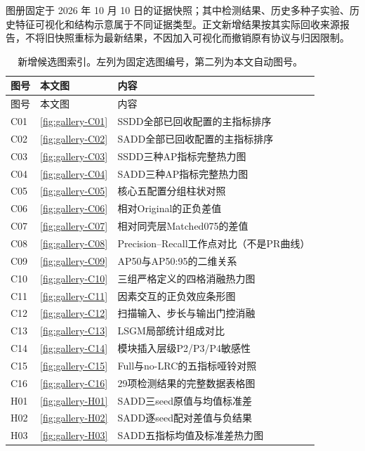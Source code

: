 \documentclass[journal]{IEEEtran}
\begin{document}
图册固定于 2026 年 10 月 10 日的证据快照；其中检测结果、历史多种子实验、历史特征可视化和结构示意属于不同证据类型。正文新增结果按其实际回收来源报告，不将旧快照重标为最新结果，不因加入可视化而撤销原有协议与归因限制。

\small
\begin{longtable}{@{}p{}p{}p{}@{}}
\caption{新增候选图索引。左列为固定选图编号，第二列为本文自动图号。}\label{tab:gallery_index}\\
\toprule
图号 & 本文图 & 内容 \\
\midrule
\endfirsthead
\toprule
图号 & 本文图 & 内容 \\
\midrule
\endhead
\bottomrule
\endfoot
C01 & \ref{fig:gallery-C01} & SSDD全部已回收配置的主指标排序 \\
C02 & \ref{fig:gallery-C02} & SADD全部已回收配置的主指标排序 \\
C03 & \ref{fig:gallery-C03} & SSDD三种AP指标完整热力图 \\
C04 & \ref{fig:gallery-C04} & SADD三种AP指标完整热力图 \\
C05 & \ref{fig:gallery-C05} & 核心五配置分组柱状对照 \\
C06 & \ref{fig:gallery-C06} & 相对Original的正负差值 \\
C07 & \ref{fig:gallery-C07} & 相对同壳层Matched075的差值 \\
C08 & \ref{fig:gallery-C08} & Precision--Recall工作点对比（不是PR曲线） \\
C09 & \ref{fig:gallery-C09} & AP50与AP50:95的二维关系 \\
C10 & \ref{fig:gallery-C10} & 三组严格定义的四格消融热力图 \\
C11 & \ref{fig:gallery-C11} & 因素交互的正负效应条形图 \\
C12 & \ref{fig:gallery-C12} & 扫描输入、步长与输出门控消融 \\
C13 & \ref{fig:gallery-C13} & LSGM局部统计组成对比 \\
C14 & \ref{fig:gallery-C14} & 模块插入层级P2/P3/P4敏感性 \\
C15 & \ref{fig:gallery-C15} & Full与no-LRC的五指标哑铃对照 \\
C16 & \ref{fig:gallery-C16} & 29项检测结果的完整数据表格图 \\
H01 & \ref{fig:gallery-H01} & SADD三seed原值与均值标准差 \\
H02 & \ref{fig:gallery-H02} & SADD逐seed配对差值与负结果 \\
H03 & \ref{fig:gallery-H03} & SADD五指标均值及标准差热力图 \\

\end{longtable}
\end{document}
